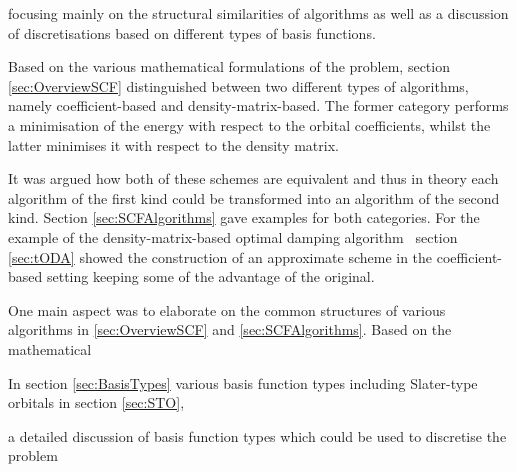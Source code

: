 focusing mainly on the structural similarities
of \SCF algorithms as well as a discussion of
discretisations based on different types of basis functions.



Based on the various mathematical formulations of the \HF problem,
section \vref{sec:OverviewSCF}
distinguished between two different types of \SCF algorithms,
namely coefficient-based and density-matrix-based.
The former category performs a minimisation of the \HF energy
with respect to the orbital coefficients,
whilst the latter minimises it with respect to the density matrix.



It was argued how both of these schemes are equivalent
and thus in theory each algorithm of the first kind could
be transformed into an algorithm of the second kind.
Section \vref{sec:SCFAlgorithms} gave examples for both categories.
For the example of the density-matrix-based
optimal damping algorithm~\cite{Cances2000a}
section \vref{sec:tODA} showed the construction of
an approximate scheme in the coefficient-based setting
keeping some of the advantage of the original.





One main aspect was to elaborate on the common structures
of various \SCF algorithms in
\vref{sec:OverviewSCF} and \vref{sec:SCFAlgorithms}.
Based on the mathematical 




In section \vref{sec:BasisTypes}
various basis function types
including Slater-type orbitals in section \ref{sec:STO},



a detailed discussion
of basis function types
which could be used to discretise the \HF problem




